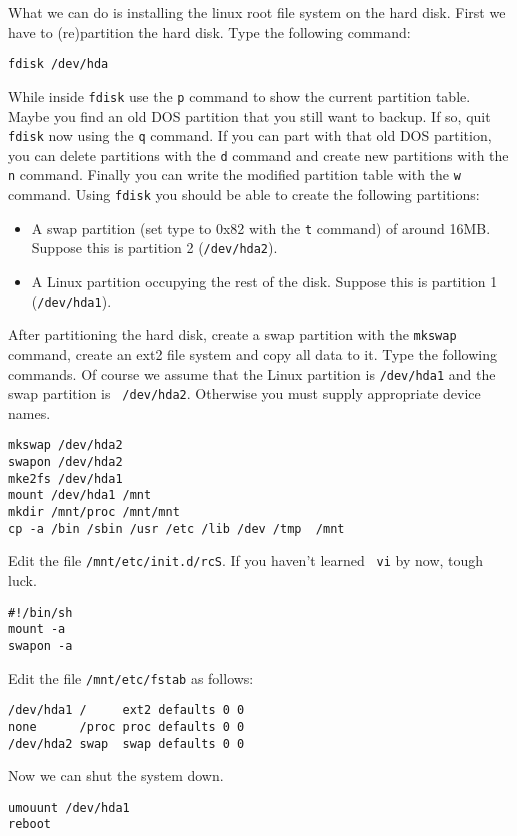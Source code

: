 \documentclass[12pt,a4paper]{article}
\begin{document}
What we can do is installing the linux root file system on the hard
disk. First we have to (re)partition the hard disk. Type the following
command:
\begin{verbatim}
fdisk /dev/hda
\end{verbatim}
While inside {\tt fdisk} use the {\tt p} command to show the current
partition table. Maybe you find an old DOS partition that you still
want to backup. If so, quit {\tt fdisk} now using the {\tt q}
command. If you can part with that old DOS partition, you can delete
partitions with the {\tt d} command and create new partitions with the
{\tt n} command. Finally you can write the modified partition table
with the {\tt w} command. Using {\tt fdisk} you should be able to
create the following partitions:
\begin{itemize}
\item A swap partition (set type to 0x82 with the {\tt t} command) of
  around 16MB. Suppose this is partition 2 ({\tt /dev/hda2}).
\item A Linux partition occupying the rest of the disk. Suppose this
  is partition 1 ({\tt /dev/hda1}).
\end{itemize}

After partitioning the hard disk, create a swap partition with the
{\tt mkswap} command, create an ext2 file system and copy all data to
it. Type the following commands. Of course we assume that the Linux
partition is {\tt /dev/hda1} and the swap partition is {\tt
  /dev/hda2}. Otherwise you must supply appropriate device names.
\begin{verbatim}
mkswap /dev/hda2
swapon /dev/hda2
mke2fs /dev/hda1
mount /dev/hda1 /mnt
mkdir /mnt/proc /mnt/mnt
cp -a /bin /sbin /usr /etc /lib /dev /tmp  /mnt
\end{verbatim}

Edit the file {\tt /mnt/etc/init.d/rcS}. If you haven't learned {\tt
  vi} by now, tough luck.
\begin{verbatim}
#!/bin/sh
mount -a
swapon -a
\end{verbatim}

Edit the file {\tt /mnt/etc/fstab} as follows:
\begin{verbatim}
/dev/hda1 /     ext2 defaults 0 0
none      /proc proc defaults 0 0
/dev/hda2 swap  swap defaults 0 0
\end{verbatim}

Now we can shut the system down.
\begin{verbatim}
umouunt /dev/hda1
reboot
\end{verbatim}
\end{document}
